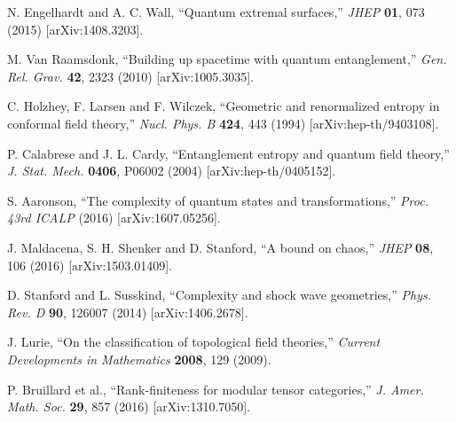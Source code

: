 \documentclass[11pt,a4paper]{article}
\theoremstyle{remark}
\theoremstyle{definition}
\begin{document}
\begin{thebibliography}{99}
N. Engelhardt and A. C. Wall, ``Quantum extremal surfaces,''
\textit{JHEP} \textbf{01}, 073 (2015) [arXiv:1408.3203].

M. Van Raamsdonk, ``Building up spacetime with quantum entanglement,''
\textit{Gen. Rel. Grav.} \textbf{42}, 2323 (2010) [arXiv:1005.3035].

C. Holzhey, F. Larsen and F. Wilczek, ``Geometric and renormalized entropy in conformal field theory,''
\textit{Nucl. Phys. B} \textbf{424}, 443 (1994) [arXiv:hep-th/9403108].

P. Calabrese and J. L. Cardy, ``Entanglement entropy and quantum field theory,''
\textit{J. Stat. Mech.} \textbf{0406}, P06002 (2004) [arXiv:hep-th/0405152].

S. Aaronson, ``The complexity of quantum states and transformations,''
\textit{Proc. 43rd ICALP} (2016) [arXiv:1607.05256].

J. Maldacena, S. H. Shenker and D. Stanford, ``A bound on chaos,''
\textit{JHEP} \textbf{08}, 106 (2016) [arXiv:1503.01409].

D. Stanford and L. Susskind, ``Complexity and shock wave geometries,''
\textit{Phys. Rev. D} \textbf{90}, 126007 (2014) [arXiv:1406.2678].

J. Lurie, ``On the classification of topological field theories,''
\textit{Current Developments in Mathematics} \textbf{2008}, 129 (2009).

P. Bruillard et al., ``Rank-finiteness for modular tensor categories,''
\textit{J. Amer. Math. Soc.} \textbf{29}, 857 (2016) [arXiv:1310.7050].

\end{thebibliography}
\end{document}
